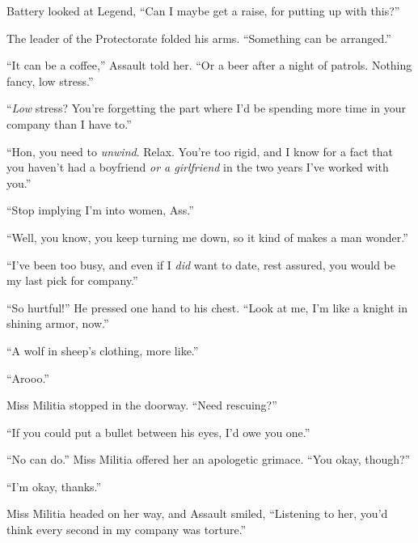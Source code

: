 Battery looked at Legend, ``Can I maybe get a raise, for putting up with this?''



The leader of the Protectorate folded his arms.  ``Something can be arranged.''



\blacksquare



``It can be a coffee,'' Assault told her.  ``Or a beer after a night of patrols.  Nothing fancy, low stress.''



``\emph{Low} stress?  You're forgetting the part where I'd be spending more time in your company than I have to.''



``Hon, you need to \emph{unwind}.  Relax.  You're too rigid, and I know for a fact that you haven't had a boyfriend \emph{or a girlfriend} in the two years I've worked with you.''



``Stop implying I'm into women, Ass.''



``Well, you know, you keep turning me down, so it kind of makes a man wonder.''



``I've been too busy, and even if I \emph{did} want to date, rest assured, you would be my last pick for company.''



``So hurtful!''  He pressed one hand to his chest.  ``Look at me, I'm like a knight in shining armor, now.''



``A wolf in sheep's clothing, more like.''



``Arooo.''



Miss Militia stopped in the doorway.  ``Need rescuing?''



``If you could put a bullet between his eyes, I'd owe you one.''



``No can do.''  Miss Militia offered her an apologetic grimace.  ``You okay, though?''



``I'm okay, thanks.''



Miss Militia headed on her way, and Assault smiled, ``Listening to her, you'd think every second in my company was torture.''



